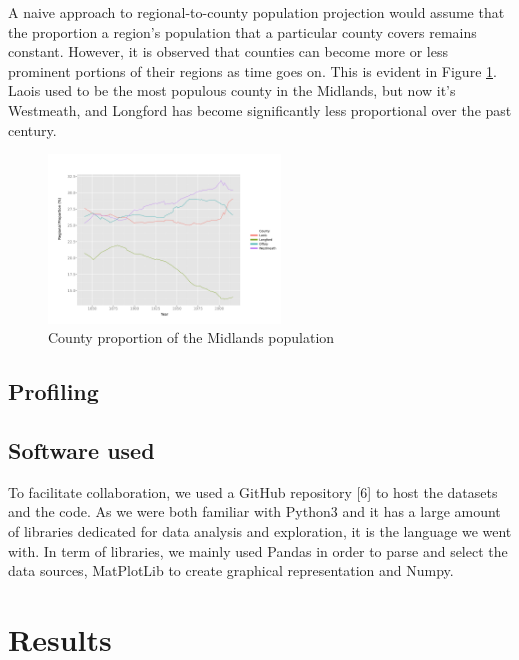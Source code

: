 \documentclass[twocolumn]{article}
\begin{document}
A naive approach to regional-to-county population projection
would assume that the proportion a region's population that a particular county
covers remains constant.  However, it is observed that counties can become more
or less prominent portions of their regions as time goes on.  This is evident
in Figure \ref{midlands}.  Laois used to be the most populous county in the Midlands,
but now it's Westmeath, and Longford has become significantly less proportional over
the past century.
\begin{figure}
    \centering
    \includegraphics[width=0.55\textwidth]{media/pdf/midlands-population-proportion.svg.pdf}
    \caption{County proportion of the Midlands population\label{midlands}}
\end{figure}
\subsection{Profiling\label{ss:profiling}}

\subsection{Software used}
To facilitate collaboration, we used a GitHub repository [6] to host the datasets and the code. As we were both familiar with Python3 and it has a large amount of libraries dedicated for data analysis and exploration, it is the language we went with. In term of libraries, we mainly used Pandas in order to parse and select the data sources, MatPlotLib to create graphical representation and Numpy.

\section{Results}
\end{document}
